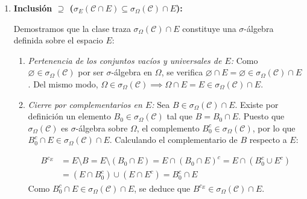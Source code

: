 \begin{demostracion}
\begin{enumerate}
    Por otra parte, para todo conjunto $B \in \mathcal{C}$, se cumple que $B \cap E \in \mathcal{C} \cap E \subseteq \sigma_E(\mathcal{C} \cap E)$, de donde $B \in \mathcal{G}$ y por ende $\mathcal{C} \subseteq \mathcal{G}$.
    
    Como $\sigma_\Omega(\mathcal{C})$ es la menor $\sigma$-álgebra sobre $\Omega$ que contiene a la clase $\mathcal{C}$, y $\mathcal{G}$ es una $\sigma$-álgebra sobre $\Omega$ que contiene a $\mathcal{C}$, se deduce la inclusión:
    \[
        \sigma_\Omega(\mathcal{C}) \subseteq \mathcal{G}
    \]
    Así pues, para todo conjunto $B \in \sigma_\Omega(\mathcal{C})$, se tiene $B \in \mathcal{G} \implies B \cap E \in \sigma_E(\mathcal{C} \cap E)$, probando la primera inclusión:
    \[
        \sigma_\Omega(\mathcal{C}) \cap E \subseteq \sigma_E(\mathcal{C} \cap E)
    \]

    \item \textbf{Inclusión $\supseteq$ ($\sigma_E(\mathcal{C} \cap E) \subseteq \sigma_\Omega(\mathcal{C}) \cap E$):}
    
    Demostramos que la clase traza $\sigma_\Omega(\mathcal{C}) \cap E$ constituye una $\sigma$-álgebra definida sobre el espacio $E$:
    \begin{enumerate}[label=\alph*)]
        \item \textit{Pertenencia de los conjuntos vacíos y universales de $E$:} Como $\varnothing \in \sigma_\Omega(\mathcal{C})$ por ser $\sigma$-álgebra en $\Omega$, se verifica $\varnothing \cap E = \varnothing \in \sigma_\Omega(\mathcal{C}) \cap E$. Del mismo modo, $\Omega \in \sigma_\Omega(\mathcal{C}) \implies \Omega \cap E = E \in \sigma_\Omega(\mathcal{C}) \cap E$.
        
        \item \textit{Cierre por complementarios en $E$:} Sea $B \in \sigma_\Omega(\mathcal{C}) \cap E$. Existe por definición un elemento $B_0 \in \sigma_\Omega(\mathcal{C})$ tal que $B = B_0 \cap E$.
        Puesto que $\sigma_\Omega(\mathcal{C})$ es $\sigma$-álgebra sobre $\Omega$, el complemento $B_0^c \in \sigma_\Omega(\mathcal{C})$, por lo que $B_0^c \cap E \in \sigma_\Omega(\mathcal{C}) \cap E$.
        Calculando el complementario de $B$ respecto a $E$:
        
        \[
            \begin{array}{rl}
                \displaystyle B^{c_E} & \displaystyle = E \setminus B = E \setminus (B_0 \cap E) = E \cap (B_0 \cap E)^c = E \cap (B_0^c \cup E^c) \\[8pt]
                & \displaystyle = (E \cap B_0^c) \cup (E \cap E^c) = B_0^c \cap E
            \end{array}    
        \]
        Como $B_0^c \cap E \in \sigma_\Omega(\mathcal{C}) \cap E$, se deduce que $B^{c_E} \in \sigma_\Omega(\mathcal{C}) \cap E$.


\end{enumerate}
\end{enumerate}
\end{demostracion}
